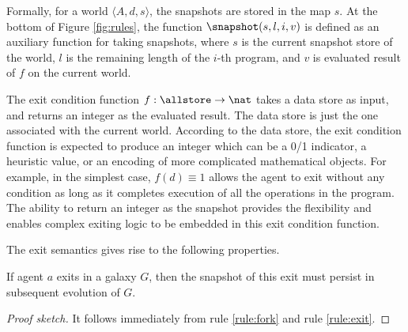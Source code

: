 Formally, for a world $\langle A,d,s\rangle$,
the snapshots are stored in the map $s$.
At the bottom of Figure \ref{fig:rules},
the function $\snapshot(s,l,i,v)$ is defined as an auxiliary function for taking snapshots,
where $s$ is the current snapshot store of the world,
$l$ is the remaining length of the $i$-th program,
and $v$ is evaluated result of $f$ on the current world.

The exit condition function $f:\allstore\to\nat$
takes a data store as input,
and returns an integer as the evaluated result.
The data store is just the one associated with the current world.
According to the data store,
the exit condition function is expected to produce an integer which can be
a 0/1 indicator, a heuristic value, or an encoding of more complicated
mathematical objects. For example, in the simplest case, $f(d)\equiv 1$
allows the agent to exit without any condition as long as it completes execution
of all the operations in the program.
The ability to return an integer as the snapshot provides the flexibility and
enables complex exiting logic to be embedded in this exit condition function.

The exit semantics gives rise to the following properties.

\begin{proposition}[Causality] If agent $a$ exits in a galaxy $G$,
then the snapshot of this exit must persist in subsequent evolution of $G$.
\end{proposition}
\begin{proof}[Proof sketch]
It follows immediately from rule \ref{rule:fork} and rule \ref{rule:exit}. 
\end{proof}

